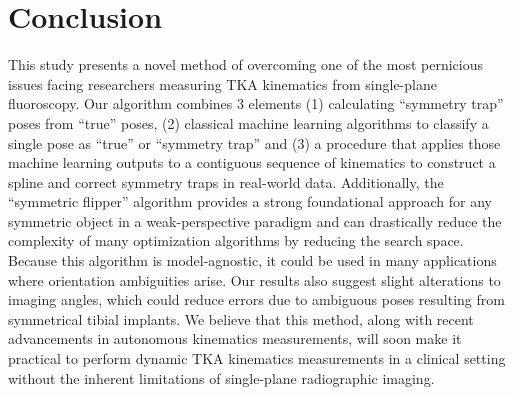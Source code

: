 \section{Conclusion}
This study presents a novel method of overcoming one of the most pernicious issues facing researchers measuring TKA kinematics from single-plane fluoroscopy.
Our algorithm combines 3 elements (1) calculating “symmetry trap” poses from “true” poses, (2) classical machine learning algorithms to classify a single pose as “true” or “symmetry trap” and (3) a procedure that applies those machine learning outputs to a contiguous sequence of kinematics to construct a spline and correct symmetry traps in real-world data.
Additionally, the “symmetric flipper” algorithm provides a strong foundational approach for any symmetric object in a weak-perspective paradigm and can drastically reduce the complexity of many optimization algorithms by reducing the search space.
Because this algorithm is model-agnostic, it could be used in many applications where orientation ambiguities arise.
Our results also suggest slight alterations to imaging angles, which could reduce errors due to ambiguous poses resulting from symmetrical tibial implants.
We believe that this method, along with recent advancements in autonomous kinematics measurements, will soon make it practical to perform dynamic TKA kinematics measurements in a clinical setting without the inherent limitations of single-plane radiographic imaging.


